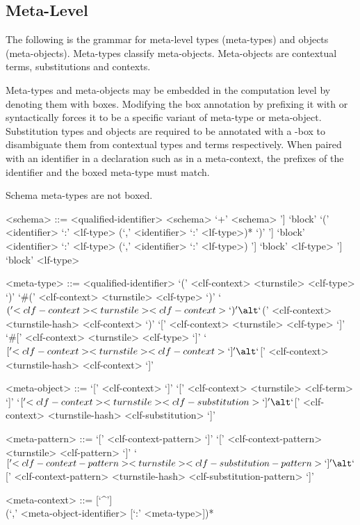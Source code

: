 \subsection{Meta-Level}\label{section:syntax-meta-level}

The following is the grammar for meta-level types (meta-types) and objects (meta-objects).
Meta-types classify meta-objects.
Meta-objects are contextual \LF terms, substitutions and contexts.

Meta-types and meta-objects may be embedded in the computation level by denoting them with boxes.
Modifying the box annotation by prefixing it with \syntax{\#} or \syntax{\$} syntactically forces it to be a specific variant of meta-type or meta-object.
Substitution types and objects are required to be annotated with a \syntax{\$}-box to disambiguate them from contextual types and terms respectively.
When paired with an identifier in a declaration such as in a meta-context, the prefixes of the identifier and the boxed meta-type must match.

Schema meta-types are not boxed.

\begin{grammar}
<schema> ::= <qualified-identifier>
\alt <schema> `+' <schema>
\alt [`some' `[' <identifier> `:' <lf-type> (`,' <identifier> `:' <lf-type>)* `]'] `block' `(' <identifier> `:' <lf-type> (`,' <identifier> `:' <lf-type>)* `)'
\alt [`some' `[' <identifier> `:' <lf-type> (`,' <identifier> `:' <lf-type>)* `]'] `block' <identifier> `:' <lf-type> (`,' <identifier> `:' <lf-type>)
\alt [`some' `[' <identifier> `:' <lf-type> (`,' <identifier> `:' <lf-type>)* `]'] `block' <lf-type>
\alt [`some' `[' <identifier> `:' <lf-type> (`,' <identifier> `:' <lf-type>)* `]'] `block' <lf-type>

<meta-type> ::= <qualified-identifier>
\alt `(' <clf-context> <turnstile> <clf-type> `)'
\alt `#(' <clf-context> <turnstile> <clf-type> `)'
\alt `$(' <clf-context> <turnstile> <clf-context> `)'
\alt `$(' <clf-context> <turnstile-hash> <clf-context> `)'
\alt `[' <clf-context> <turnstile> <clf-type> `]'
\alt `#[' <clf-context> <turnstile> <clf-type> `]'
\alt `$[' <clf-context> <turnstile> <clf-context> `]'
\alt `$[' <clf-context> <turnstile-hash> <clf-context> `]'

<meta-object> ::= `[' <clf-context> `]'
\alt `[' <clf-context> <turnstile> <clf-term> `]'
\alt `$[' <clf-context> <turnstile> <clf-substitution> `]'
\alt `$[' <clf-context> <turnstile-hash> <clf-substitution> `]'

<meta-pattern> ::= `[' <clf-context-pattern> `]'
\alt `[' <clf-context-pattern> <turnstile> <clf-pattern> `]'
\alt `$[' <clf-context-pattern> <turnstile> <clf-substitution-pattern> `]'
\alt `$[' <clf-context-pattern> <turnstile-hash> <clf-substitution-pattern> `]'

<meta-context> ::= [`^']
\\
(`,' <meta-object-identifier> [`:' <meta-type>])*
\end{grammar}

